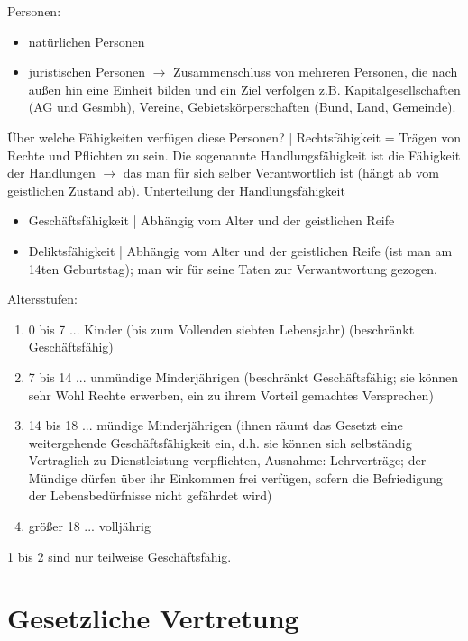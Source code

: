 \documentclass[a4paper]{report}
\begin{document}
Personen:

\begin{itemize}
\item natürlichen Personen
\item juristischen Personen $\rightarrow$ Zusammenschluss von mehreren Personen, die nach außen hin eine Einheit bilden und ein Ziel verfolgen z.B. Kapitalgesellschaften (AG und Gesmbh), Vereine, Gebietskörperschaften (Bund, Land, Gemeinde). 
\end{itemize}

Über welche Fähigkeiten verfügen diese Personen? | Rechtsfähigkeit = Trägen von Rechte und Pflichten zu sein. Die sogenannte Handlungsfähigkeit ist die Fähigkeit der Handlungen $\rightarrow$ das man für sich selber Verantwortlich ist (hängt ab vom geistlichen Zustand ab).
\newline
\newline
Unterteilung der Handlungsfähigkeit

\begin{itemize}
\item Geschäftsfähigkeit | Abhängig vom Alter und der geistlichen Reife
\item Deliktsfähigkeit  | Abhängig vom Alter und der geistlichen Reife (ist man am 14ten Geburtstag); man wir für seine Taten zur Verwantwortung gezogen.
\end{itemize}

Altersstufen:

\begin{enumerate}
\item 0 bis 7 ... Kinder (bis zum Vollenden siebten Lebensjahr) (beschränkt Geschäftsfähig)
\item 7 bis 14 ... unmündige Minderjährigen (beschränkt Geschäftsfähig; sie können sehr Wohl Rechte erwerben, ein zu ihrem Vorteil gemachtes Versprechen)
\item 14 bis 18 ... mündige Minderjährigen (ihnen räumt das Gesetzt eine weitergehende Geschäftsfähigkeit ein, d.h. sie können sich selbständig Vertraglich zu Dienstleistung verpflichten, Ausnahme: Lehrverträge; der Mündige dürfen über ihr Einkommen frei verfügen, sofern die Befriedigung der Lebensbedürfnisse nicht gefährdet wird)
\item größer 18 ... volljährig
\end{enumerate}

1 bis 2 sind nur teilweise Geschäftsfähig.

\section{Gesetzliche Vertretung}
\end{document}
